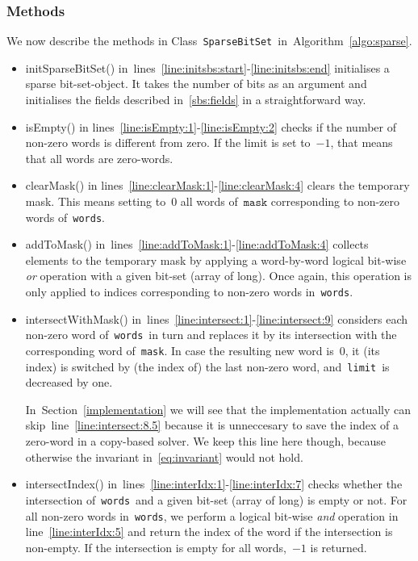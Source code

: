 \documentclass[a4paper,11pt]{article}
\newcommand{\Secref}[1]{Section~\ref{#1}}
\newcommand{\Algoref}[1]{Algorithm~\ref{#1}}
\newcommand{\lineref}[1]{line~\ref{#1}}
\newcommand{\linesref}[2]{lines~\ref{#1}-\ref{#2}}
\newcommand{\Eqref}[1]{\eqref{#1}}
\newcommand{\Words}{\texttt{words}}
\newcommand{\Mask}{\texttt{mask}}
\newcommand{\Limit}{\texttt{limit}}
\newcommand{\SparseBitSet}{\texttt{SparseBitSet}}
\numberwithin{equation}{section}
\begin{document}
\subsubsection{Methods}
We now describe the methods in Class~\SparseBitSet~in~\Algoref{algo:sparse}.

\begin{itemize}
  \item initSparseBitSet() in~\linesref{line:initsbs:start}{line:initsbs:end}
    initialises a sparse bit-set-object. It takes 
    the number of bits as an argument and initialises the fields
    described in~\ref{sbs:fields} in a straightforward way.

  \item isEmpty() in lines~\ref{line:isEmpty:1}-\ref{line:isEmpty:2} checks
    if the number of non-zero words is different from zero. If the limit is
    set to~$-1$, that means that all words are zero-words.

  \item clearMask() in lines~\ref{line:clearMask:1}-\ref{line:clearMask:4}
    clears the temporary mask. This means setting to~$0$ all words of~$\Mask$
    corresponding to non-zero words of~\Words.

  \item addToMask() in~\linesref{line:addToMask:1}{line:addToMask:4} collects
    elements to the temporary mask by applying a word-by-word logical bit-wise
    \emph{or} operation with a given bit-set (array of long).
    Once again, this operation is only applied to indices corresponding to
    non-zero words in~\Words.

  \item intersectWithMask() in~\linesref{line:intersect:1}{line:intersect:9}
    considers each non-zero word of~\Words~in turn
    and replaces it by its intersection with the corresponding word of~\Mask.
    In case the resulting new word is~$0$, it (its index) is switched
    by (the index of) the last non-zero word, and~\Limit~is
    decreased by one.
    
    In~\Secref{implementation} we will see that the implementation
    actually can skip~\lineref{line:intersect:8.5} because it is unneccesary
    to save the index of a zero-word in a copy-based solver. We keep this
    line here though, because otherwise the invariant in~\Eqref{eq:invariant} 
    would not hold.
    
  \item intersectIndex() in~\linesref{line:interIdx:1}{line:interIdx:7}
    checks whether the intersection of~\Words~and a given bit-set
    (array of long) is empty or not. For all non-zero words in~\Words,
    we perform a logical bit-wise \emph{and} operation 
    in line~\ref{line:interIdx:5} and return
    the index of the word if the intersection is non-empty. If the
    intersection is empty for all words,~$-1$ is returned.
\end{itemize}
\end{document}
